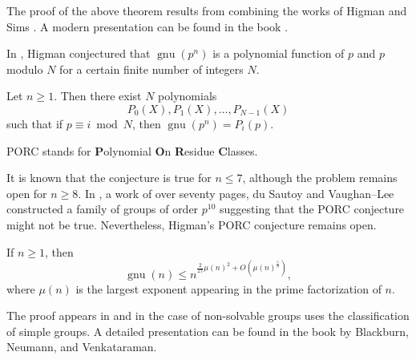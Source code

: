 The proof of the above theorem results from combining the works of Higman \cite{MR113948}
and Sims \cite{MR169921}. A modern presentation can be found in the book
\cite{MR2382539}.

In \cite{MR123605}, Higman conjectured that $\operatorname{gnu}(p^n)$ is a polynomial function of $p$ and $p$ modulo $N$ for a certain
finite number of integers $N$. 

\begin{conjecture}[Higman]
Let $n\geq1$. Then there exist $N$ polynomials
\[
P_{0}(X),P_{1}(X),\dots,P_{N-1}(X)
\]
such that
if $p\equiv i\bmod N$, then $\operatorname{gnu}(p^n)=P_{i}(p)$.
\end{conjecture}

PORC stands for \textbf{P}olynomial \textbf{O}n \textbf{R}esidue \textbf{C}lasses.

It is known that the conjecture is true for $n\leq7$, although the problem remains open for $n\geq8$.
In \cite{MR2921623}, a work of over seventy pages,
du Sautoy and Vaughan--Lee constructed a family of groups
of order $p^{10}$ suggesting that the PORC conjecture might not be true. Nevertheless, Higman's PORC conjecture remains open.

\begin{theorem}[Pyber]
If $n\geq1$, then
\[
\operatorname{gnu}(n)\leq n^{\frac{2}{27}\mu(n)^2+O\left(\mu(n)^{\frac{5}{3}}\right)},
\]
where $\mu(n)$ is the largest exponent
appearing in the prime factorization of $n$.
\end{theorem}

The proof appears in \cite{MR1200081} and in the case of non-solvable groups uses the classification of simple groups. A detailed presentation can be found in the book
\cite{MR2382539} by Blackburn, Neumann, and Venkataraman.
